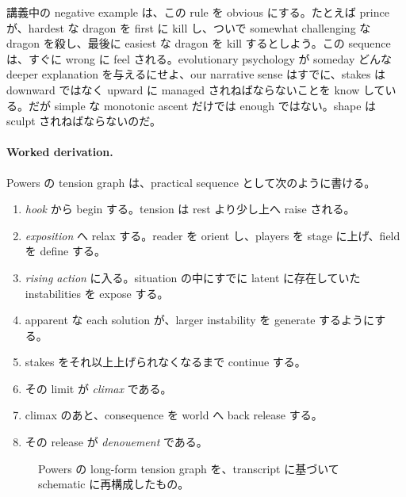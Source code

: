 講義中の negative example は、この rule を obvious にする。たとえば prince が、hardest な dragon を first に kill し、ついで somewhat challenging な dragon を殺し、最後に easiest な dragon を kill するとしよう。この sequence は、すぐに wrong に feel される。evolutionary psychology が someday どんな deeper explanation を与えるにせよ、our narrative sense はすでに、stakes は downward ではなく upward に managed されねばならないことを know している。だが simple な monotonic ascent だけでは enough ではない。shape は sculpt されねばならないのだ。

\paragraph{Worked derivation.} Powers の tension graph は、practical sequence として次のように書ける。
\begin{enumerate}
\item \emph{hook} から begin する。tension は rest より少し上へ raise される。
\item \emph{exposition} へ relax する。reader を orient し、players を stage に上げ、field を define する。
\item \emph{rising action} に入る。situation の中にすでに latent に存在していた instabilities を expose する。
\item apparent な each solution が、larger instability を generate するようにする。
\item stakes をそれ以上上げられなくなるまで continue する。
\item その limit が \emph{climax} である。
\item climax のあと、consequence を world へ back release する。
\item その release が \emph{denouement} である。
\end{enumerate}

\begin{figure}[h]
\centering
{}
\caption{Powers の long-form tension graph を、transcript に基づいて schematic に再構成したもの。}
\end{figure}

